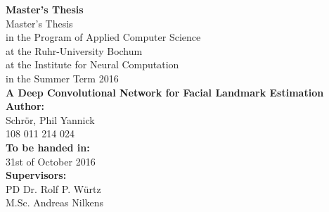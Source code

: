 \documentclass[11pt, a4paper]{article}
\begin{document}
\thispagestyle{empty}

\setlength{\hoffset}{-0.5cm} %

\lstset{
  basicstyle=\small,           %
  breaklines=true,             %
  captionpos=b,                %
  frame=single,                %
  keepspaces=true,             %
  numbers=right,               %
  showspaces=false,            %
  stepnumber=1,                %
  tabsize=4,                   %
  xleftmargin=0.14cm		   %
}

\begin{titlepage}
    \begin{center}
    \Large \textbf{Master's Thesis}\\
    \vspace{3cm}
    \normalsize
    Master's Thesis\\
    in the Program of Applied Computer Science\\
    at the Ruhr-University Bochum\\
    at the Institute for Neural Computation\\
    in the Summer Term 2016\\
    \vspace{3cm}
    \LARGE \textbf{A Deep Convolutional Network for Facial Landmark Estimation} \\
    \vspace{3cm}
    \normalsize
    \textbf{Author:}\\
    Schrör, Phil Yannick\\
    108 011 214 024\\
    \vspace{2cm}
    \textbf{To be handed in:}\\
    31st of October 2016\\
    \vspace{2cm}
    \textbf{Supervisors:}\\
    PD Dr. Rolf P. Würtz\\
    M.Sc. Andreas Nilkens
    \end{center}
\end{titlepage}
\end{document}

